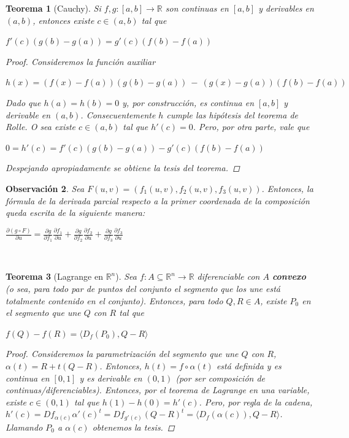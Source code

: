 \documentclass[]{article}
\newtheorem{teo}{Teorema}
\newtheorem{obs}[teo]{Observación}
\def\R{\mathbb{R}}
\newcommand{\ip}[2]{\langle #1,#2 \rangle}
\begin{document}
\begin{teo}[Cauchy]
	Si $f,g:[a,b]\to \R$ son continuas en $[a,b]$ y derivables en $(a,b)$, entonces existe $c\in (a,b)$ tal que 
	\begin{center}
		$f'(c)(g(b)-g(a)) = g'(c)(f(b)-f(a))$
	\end{center}
	\begin{proof}
		Consideremos la función auxiliar 
		\begin{center}
			$h(x) = (f(x)-f(a))(g(b)-g(a))\ -\ (g(x)-g(a))(f(b)-f(a))$
		\end{center}
		Dado que $h(a)=h(b)=0$ y, por construcción, es continua en $[a,b]$ y derivable en $(a,b)$. Consecuentemente $h$ cumple las hipótesis del teorema de Rolle. O sea existe $c\in (a,b)$ tal que $h'(c) = 0$. Pero, por otra parte, vale que
		\begin{center}
			$0 = h'(c) = f'(c)(g(b)-g(a)) - g'(c)(f(b)-f(a))$
		\end{center}
		Despejando apropiadamente se obtiene la tesis del teorema.
	\end{proof}
\end{teo}

\begin{obs}
	Sea $F(u,v) = (f_1(u,v),f_2(u,v),f_3(u,v))$. Entonces, la fórmula de la derivada parcial respecto a la primer coordenada de la composición queda escrita de la siguiente manera:
	\begin{center}
		$\displaystyle \frac{\partial (g \circ F)}{\partial u} = \frac{\partial g}{\partial f_1}\frac{\partial f_1}{\partial u} + \frac{\partial g}{\partial f_2}\frac{\partial f_2}{\partial u} + \frac{\partial g}{\partial f_3}\frac{\partial f_3}{\partial u}$
	\end{center}
\end{obs}
~\newline

\begin{teo}[Lagrange en $\R^n$]
	Sea $f:A\subseteq \R^n\to \R$ diferenciable con $A$ \textbf{convexo} (o sea, para todo par de puntos del conjunto el segmento que los une está totalmente contenido en el conjunto). Entonces, para todo $Q,R\in A$, existe $P_0$ en el segmento que une $Q$ con $R$ tal que
	\begin{center}
		$f(Q)-f(R) = \ip{D_f(P_0)}{Q-R}$
	\end{center}
	\begin{proof}
		Consideremos la parametrización del segmento que une $Q$ con $R$, $\alpha(t) = R+t(Q-R)$. Entonces, $h(t) = f \circ \alpha(t)$ está definida y es continua en $[0,1]$ y es derivable en $(0,1)$ (por ser composición de continuas/diferenciables). Entonces, por el teorema de \textit{Lagrange} en una variable, existe $c\in (0,1)$ tal que $h(1) - h(0) = h'(c)$. Pero, por regla de la cadena, $h'(c) = Df_{\alpha(c)}\alpha'(c)^t = Df_{g'(c)}(Q-R)^t = \ip{D_f(\alpha(c))}{Q-R}$. Llamando $P_0$ a $\alpha(c)$ obtenemos la tesis.
	\end{proof}
\end{teo}
\end{document}
